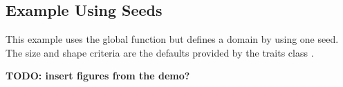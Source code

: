 \subsection{Example Using Seeds}

This example uses the global function  but
defines a domain by using one seed. The size and shape criteria are the
defaults provided by the traits class .


\textbf{TODO: insert figures from the demo?}

